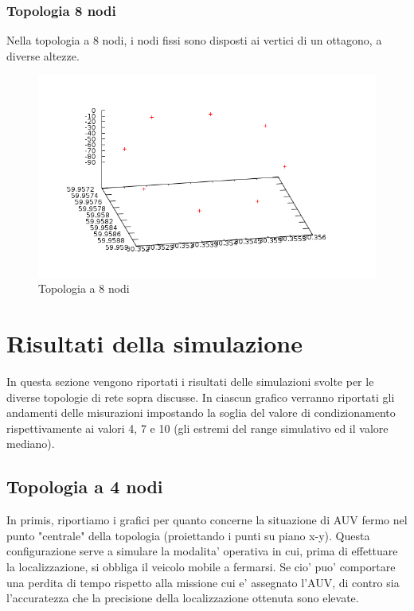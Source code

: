 \subsubsection{Topologia 8 nodi}
Nella topologia a 8 nodi, i nodi fissi sono disposti ai vertici di un ottagono, a diverse altezze.
\begin{figure}[H]
    \centering
    \includegraphics[width=\linewidth]{topologyoctagon.png}
    \caption{Topologia a 8 nodi}
    \label{fig:my_label}
\end{figure}

\section{Risultati della simulazione}
In questa sezione vengono riportati i risultati delle simulazioni svolte per le diverse topologie di rete sopra discusse. In ciascun grafico verranno riportati gli andamenti delle misurazioni impostando la soglia del valore di condizionamento rispettivamente ai valori 4, 7 e 10 (gli estremi del range simulativo ed il valore mediano).  
\subsection{Topologia a 4 nodi}
In primis, riportiamo i grafici per quanto concerne la situazione di AUV fermo nel punto "centrale" della topologia (proiettando i punti su piano x-y). Questa configurazione serve a simulare la modalita' operativa in cui, prima di effettuare la localizzazione, si obbliga il veicolo mobile a fermarsi. Se cio' puo' comportare una perdita di tempo rispetto alla missione cui e' assegnato l'AUV, di contro sia l'accuratezza che la precisione della localizzazione ottenuta sono elevate.

